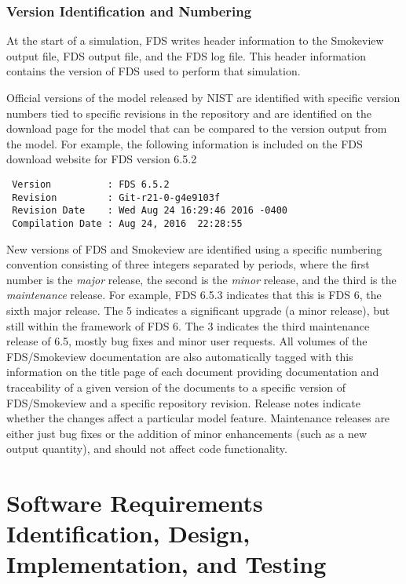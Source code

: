 \documentclass[11pt]{book}
\begin{document}
\subsection{Version Identification and Numbering}

At the start of a simulation, FDS writes header information to the Smokeview output file, FDS output file, and the FDS log file.  This header information contains the version of FDS used to perform that simulation.

Official versions of the model released by NIST are identified with specific version numbers tied to specific revisions in the repository and are identified on the download page for the model that can be compared to the version output from the model. For example, the following information is included on the FDS download website for FDS version 6.5.2

\begin{lstlisting}
 Version          : FDS 6.5.2
 Revision         : Git-r21-0-g4e9103f
 Revision Date    : Wed Aug 24 16:29:46 2016 -0400
 Compilation Date : Aug 24, 2016  22:28:55
\end{lstlisting}

New versions of FDS and Smokeview are identified using a specific numbering convention consisting of three integers separated by periods, where the first number is the {\em major} release, the second is the {\em minor} release, and the third is the {\em maintenance} release. For example, FDS 6.5.3 indicates that this is FDS 6, the sixth major release. The 5 indicates a significant upgrade (a minor release), but still within the framework of FDS 6.  The 3 indicates the third maintenance release of 6.5, mostly bug fixes and minor user requests. All volumes of the FDS/Smokeview documentation are also automatically tagged with this information on the title page of each document providing documentation and traceability of a given version of the documents to a specific version of FDS/Smokeview and a specific repository revision. Release notes indicate whether the changes affect a particular model feature. Maintenance releases are either just bug fixes or the addition of minor enhancements (such as a new output quantity), and should not affect code functionality.



\chapter{Software Requirements Identification, Design, Implementation, and Testing}
\end{document}
